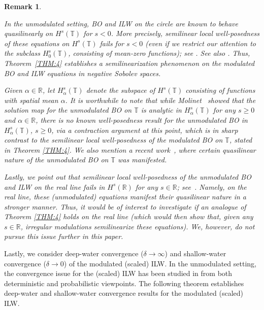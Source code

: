 \documentclass[letterpaper, 11pt,  reqno]{amsart}
\newtheorem{remark}[theorem]{Remark}
\newcommand{\1}{\hspace{0.5mm}\text{I}\hspace{0.5mm}}
\newcommand{\R}{\mathbb{R}}
\newcommand{\T}{\mathbb{T}}
\newcommand{\al}{\alpha}
\newcommand{\dl}{\delta}
\numberwithin{equation}{section}
\numberwithin{theorem}{section}
\begin{document}
\begin{remark}\label{REM:BO}\rm


In the unmodulated setting, 
BO and ILW on the circle
are known to behave 
quasilinearly
on $H^s(\T)$ for $s < 0$.
More precisely, 
semilinear local well-posedness
of these equations
on $H^s(\T)$
fails for  $s < 0$
(even if we restrict our attention to the subclass $H^s_0(\T)$, 
consisting of mean-zero functions);
see \cite[Theorem 1.2]{Moli2}.
See also 
\cite[second paragraph on p.\,640]{Moli2}.
Thus, Theorem~\ref{THM:4}
establishes 
a semilinearization phenomenon on the modulated BO and  ILW equations
in negative Sobolev spaces.






Given $\al \in \R$, let 
$H^s_\al(\T)$
denote the subspace of  $H^s(\T)$
consisting of functions with spatial mean $\al$.
It is worthwhile to note that 
while
Molinet~\cite[Theorem~1.2]{Moli2} showed that the solution map
for the unmodulated BO on $\T$ 
is  analytic
in $H^s_\al(\T)$
for any $s \ge 0$ and $\al \in \R$, 
 there is {\it no} known well-posedness result 
for the unmodulated BO  
in $H^s_\al(\T)$, $s \ge 0$, 
  via a contraction argument
at this point,
which is in sharp contrast to 
the semilinear local well-posedness of 
the modulated BO on $\T$, stated in 
Theorem \ref{THM:4}.
We also mention a recent work~\cite{GKT24}, 
where certain quasilinear nature of the unmodulated BO on $\T$
was manifested.




Lastly, 
we point out  that 
 semilinear local well-posedness 
of the unmodulated  BO and ILW on the real line  
fails in $H^s(\R)$ for {\it any}  
 $s \in \R$; see~\cite{MST, KTz2, CHLO}.
Namely, on the real line, these (unmodulated) equations 
manifest their quasilinear nature in 
a stronger manner.
Thus, it would be of interest to investigate 
if an analogue
of 
Theorem \ref{THM:4} holds on the real line
(which would then 
show that, 
given any $s \in \R$, 
irregular modulations 
semilinearize  these equations).
We, however, do not pursue this issue further in this paper.




\end{remark}





Lastly, we consider deep-water convergence ($\dl \to \infty$)
and shallow-water convergence ($\dl \to 0$)
of the modulated (scaled) ILW.
In the unmodulated setting,  
the convergence  issue
 for the (scaled) ILW
 has been studied in 
 \cite{ABFS, Li24, LOZ,  CLOP,  FLZ, CLO, GL, HKV, CLOZ, CHLO}
from both deterministic and probabilistic viewpoints.
The following theorem establishes
deep-water 
and shallow-water convergence results
for the modulated (scaled) ILW.
\end{document}
